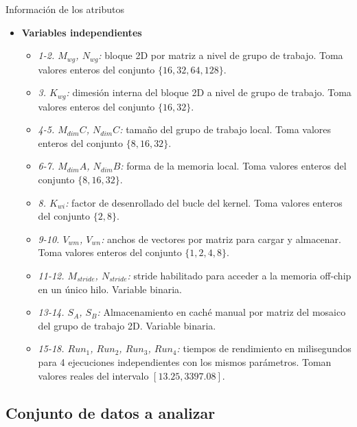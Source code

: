 \documentclass[osajnl,twocolumn,showpacs,superscriptaddress,10pt]{revtex4-1} %
\begin{document}
\subsubsection{}{Información de los atributos}

\begin{itemize}
    \item \textbf{Variables independientes}

    \begin{itemize}
        \item \textit{1-2. $M_{wg}$, $N_{wg}$:} bloque 2D por matriz a nivel de grupo de trabajo. Toma valores enteros del conjunto $\{16, 32, 64, 128\}$.
        \item \textit{3. $K_{wg}$:} dimesión interna del bloque 2D a nivel de grupo de trabajo. Toma valores enteros del conjunto $\{16, 32\}$.
        \item \textit{4-5. $M_{dim}C$, $N_{dim}C$:} tamaño del grupo de trabajo local. Toma valores enteros del conjunto $\{8, 16, 32\}$.
        \item \textit{6-7. $M_{dim}A$, $N_{dim}B$:} forma de la memoria local. Toma valores enteros del conjunto $\{8, 16, 32\}$.
        \item \textit{8. $K_{wi}$:} factor de desenrollado del bucle del kernel. Toma valores enteros del conjunto $\{2, 8\}$.
        \item \textit{9-10. $V_{wm}$, $V_{wn}$:} anchos de vectores por matriz para cargar y almacenar. Toma valores enteros del conjunto $\{1, 2, 4, 8\}$.
        \item \textit{11-12. $M_{stride}$, $N_{stride}$:} stride habilitado para acceder a la memoria off-chip en un único hilo. Variable binaria.
        \item \textit{13-14. $S_{A}$, $S_{B}$:} Almacenamiento en caché manual por matriz del mosaico del grupo de trabajo 2D. Variable binaria.
    \end{itemize}

    \begin{itemize}
        \item \textit{15-18. $Run_1$, $Run_2$, $Run_3$, $Run_4$:} tiempos de rendimiento en milisegundos para 4 ejecuciones independientes con los mismos parámetros. Toman valores reales del intervalo $[13.25, 3397.08]$.
    \end{itemize}
\end{itemize}

\subsection{Conjunto de datos a analizar}
\end{document}
